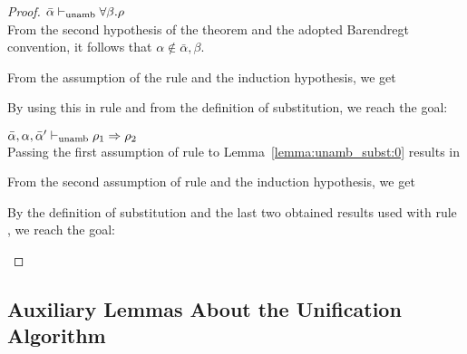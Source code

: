 \begin{proof}
\item[\fbox{\rref{UA-TAbs}}]\quad${\bar{\alpha} \vdash_{\mathrm{unamb}} \forall \beta. \rho}$\\

From the second hypothesis of the theorem and the adopted Barendregt convention, it follows that $\alpha\notin\bar\alpha,\beta$.

From the assumption of the rule and the induction hypothesis, we get
\begin{myequation*}
\end{myequation*}
By using this in rule  and from the definition of substitution, we reach the goal:
\begin{myequation*}
\end{myequation*}

\item[\fbox{\rref{UA-IAbs}}]\quad${\bar{\alpha},\alpha,\bar{\alpha}' \vdash_{\mathrm{unamb}} \rho_1\Rightarrow\rho_2}$\\

Passing the first assumption of rule  to Lemma~\ref{lemma:unamb_subst:0} results in
\begin{myequation*}
\end{myequation*}
From the second assumption of rule  and the induction hypothesis, we get
\begin{myequation*}
\end{myequation*}
By the definition of substitution and the last two obtained results used with rule
, we reach the goal:
\begin{myequation*}
\end{myequation*}
\end{proof}

\subsection{Auxiliary Lemmas About the Unification Algorithm}

